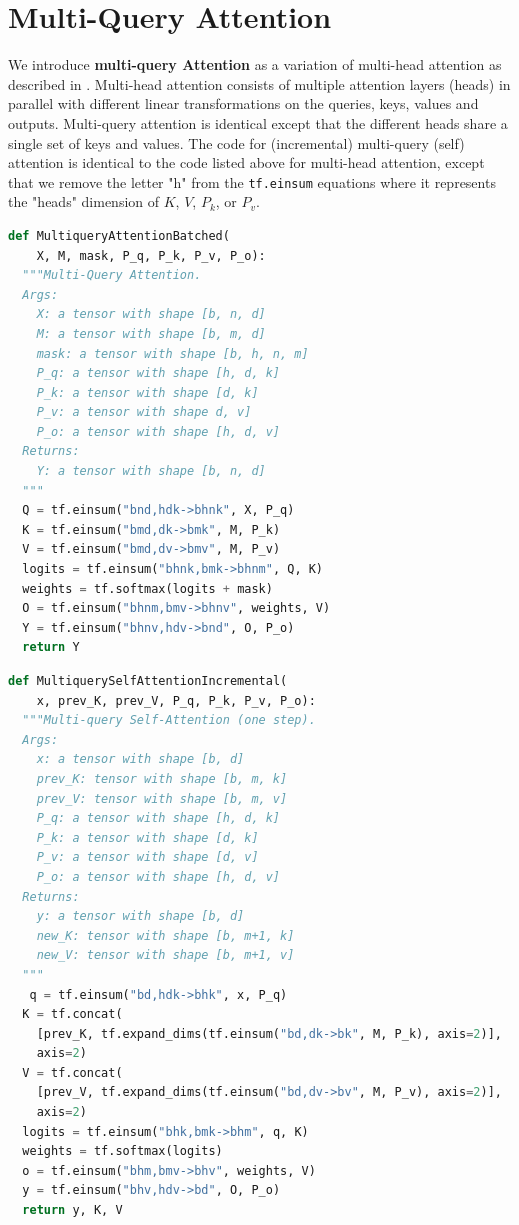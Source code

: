 \documentclass{article}
\begin{document}
\section{Multi-Query Attention}

We introduce \textbf{multi-query Attention} as a variation of multi-head attention as described in \citep{Vas17}.  Multi-head attention consists of multiple attention layers (heads) in parallel with different linear transformations on the queries, keys, values and outputs.  Multi-query attention is identical except that the different heads share a single set of keys and values.  The code for (incremental) multi-query (self) attention is identical to the code listed above for multi-head attention, except that we remove the letter "h" from the \texttt{tf.einsum} equations where it represents the "heads" dimension of $K$, $V$, $P_k$, or $P_v$.

\begin{minipage}{\linewidth}
\begin{lstlisting}[language=Python]
def MultiqueryAttentionBatched(
    X, M, mask, P_q, P_k, P_v, P_o):
  """Multi-Query Attention.
  Args:
    X: a tensor with shape [b, n, d]
    M: a tensor with shape [b, m, d]
    mask: a tensor with shape [b, h, n, m]
    P_q: a tensor with shape [h, d, k]
    P_k: a tensor with shape [d, k]
    P_v: a tensor with shape d, v]
    P_o: a tensor with shape [h, d, v]
  Returns:
    Y: a tensor with shape [b, n, d]
  """
  Q = tf.einsum("bnd,hdk->bhnk", X, P_q)
  K = tf.einsum("bmd,dk->bmk", M, P_k)
  V = tf.einsum("bmd,dv->bmv", M, P_v)
  logits = tf.einsum("bhnk,bmk->bhnm", Q, K)
  weights = tf.softmax(logits + mask)
  O = tf.einsum("bhnm,bmv->bhnv", weights, V)
  Y = tf.einsum("bhnv,hdv->bnd", O, P_o)
  return Y
\end{lstlisting}
\end{minipage}

\begin{minipage}{\linewidth}
\begin{lstlisting}[language=Python]
def MultiquerySelfAttentionIncremental(
    x, prev_K, prev_V, P_q, P_k, P_v, P_o):
  """Multi-query Self-Attention (one step).
  Args:
    x: a tensor with shape [b, d]
    prev_K: tensor with shape [b, m, k]
    prev_V: tensor with shape [b, m, v]
    P_q: a tensor with shape [h, d, k]
    P_k: a tensor with shape [d, k]
    P_v: a tensor with shape [d, v]
    P_o: a tensor with shape [h, d, v]
  Returns:
    y: a tensor with shape [b, d]
    new_K: tensor with shape [b, m+1, k]
    new_V: tensor with shape [b, m+1, v]
  """
   q = tf.einsum("bd,hdk->bhk", x, P_q)
  K = tf.concat(
    [prev_K, tf.expand_dims(tf.einsum("bd,dk->bk", M, P_k), axis=2)],
    axis=2)
  V = tf.concat(
    [prev_V, tf.expand_dims(tf.einsum("bd,dv->bv", M, P_v), axis=2)],
    axis=2)
  logits = tf.einsum("bhk,bmk->bhm", q, K)
  weights = tf.softmax(logits)
  o = tf.einsum("bhm,bmv->bhv", weights, V)
  y = tf.einsum("bhv,hdv->bd", O, P_o)
  return y, K, V
\end{lstlisting}
\end{minipage}
\end{document}
